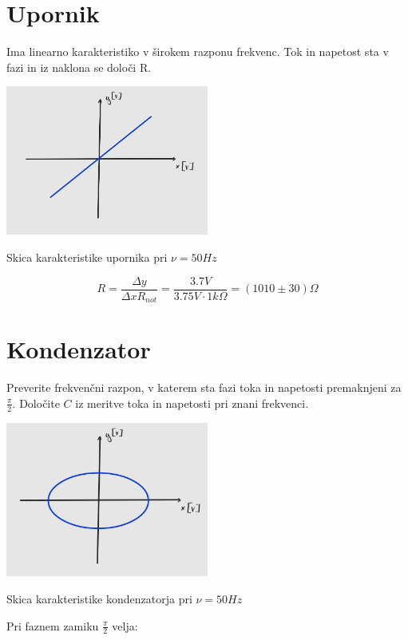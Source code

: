 \documentclass[12pt]{report}
\begin{document}
\section*{Upornik}

Ima linearno karakteristiko v širokem razponu frekvenc. Tok in napetost sta v fazi in iz naklona se določi R. 

\begin{slika}[H]
  \centering
  \includegraphics[width=0.5\textwidth]{upornik}
  \caption{\small Skica karakteristike upornika pri $\nu = 50\si{Hz}$}
\end{slika}

\[
  R = \frac{\Delta y}{\Delta x R_{not}} = \frac{3.7\si{V}}{3.75\si{V} \cdot 1k\Omega} = (1010 \pm 30) \Omega
\]

\section*{Kondenzator}

Preverite frekvenčni razpon, v katerem sta fazi toka in napetosti premaknjeni za $\frac{\pi}{2}$. Določite $C$ iz meritve toka in napetosti pri znani frekvenci. 

\begin{slika}[H]
  \centering
  \includegraphics[width=0.5\textwidth]{kondenzator}
  \caption{\small Skica karakteristike kondenzatorja pri $\nu = 50\si{Hz}$}
\end{slika}

Pri faznem zamiku $\frac{\pi}{2}$ velja: 
\end{document}
